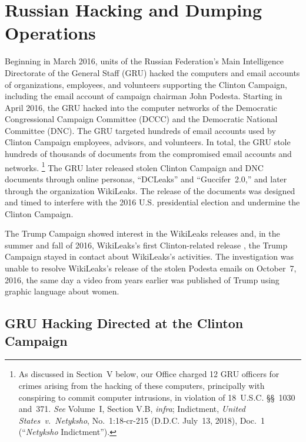 \section{Russian Hacking and Dumping Operations}

Beginning in March 2016, units of the Russian Federation's Main Intelligence Directorate of the General Staff (GRU) hacked the computers and email accounts of organizations, employees, and volunteers supporting the Clinton Campaign, including the email account of campaign chairman John Podesta.
Starting in April 2016, the GRU hacked into the computer networks of the Democratic Congressional Campaign Committee (DCCC) and the Democratic National Committee (DNC).
The GRU targeted hundreds of email accounts used by Clinton Campaign employees, advisors, and volunteers.
In total, the GRU stole hundreds of thousands of documents from the compromised email accounts and networks.%
\footnote{As discussed in Section~V below, our Office charged 12 GRU officers for crimes arising from the hacking of these computers, principally with conspiring to commit computer intrusions, in violation of
18~U.S.C. \S\S~1030 and~371.
\textit{See} Volume~I, Section V.B, \textit{infra};
Indictment, \textit{United States~v.\ Netyksho}, No.~1:18-cr-215 (D.D.C. July~13, 2018), Doc.~1 (``\textit{Netyksho} Indictment'').}
The GRU later released stolen Clinton Campaign and DNC documents through online personas, ``DCLeaks'' and ``Guccifer~2.0,'' and later through the organization WikiLeaks.
The release of the documents was designed and timed to interfere with the 2016 U.S. presidential election and undermine the Clinton Campaign.

The Trump Campaign showed interest in the WikiLeaks releases and, in the summer and fall of 2016, 
WikiLeaks's first Clinton-related release , the Trump Campaign stayed in contact  about WikiLeaks's activities.
The investigation was unable to resolve 
WikiLeaks's release of the stolen Podesta emails on October~7, 2016, the same day a video from years earlier was published of Trump using graphic language about women.

\subsection{GRU Hacking Directed at the Clinton Campaign}

